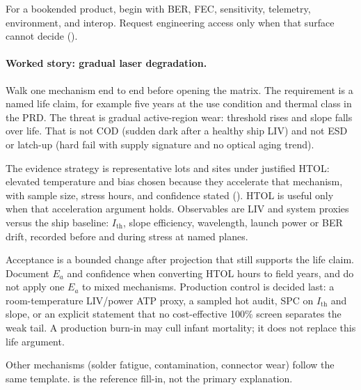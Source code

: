 
For a bookended product, begin with BER, FEC, sensitivity, telemetry,
environment, and interop. Request engineering access only when that surface
cannot decide ().

\paragraph{Worked story: gradual laser degradation.}
Walk one mechanism end to end before opening the matrix. The requirement is a
named life claim, for example five years at the use condition and thermal class
in the PRD. The threat is gradual active-region wear: threshold rises and slope
falls over life. That is not COD (sudden dark after a healthy ship LIV) and not
ESD or latch-up (hard fail with supply signature and no optical aging trend).

The evidence strategy is representative lots and sites under justified HTOL:
elevated temperature and bias chosen because they accelerate that mechanism,
with sample size, stress hours, and confidence stated
(). HTOL is useful only when that
acceleration argument holds. Observables are LIV and system proxies versus the
ship baseline: $I_\mathrm{th}$, slope efficiency, wavelength, launch power or
BER drift, recorded before and during stress at named planes.

Acceptance is a bounded change after projection that still supports the life
claim. Document $E_a$ and confidence when converting HTOL hours to field years,
and do not apply one $E_a$ to mixed mechanisms. Production control is decided
last: a room-temperature LIV/power ATP proxy, a sampled hot audit, SPC on
$I_\mathrm{th}$ and slope, or an explicit statement that no cost-effective 100\%
screen separates the weak tail. A production burn-in may cull infant mortality;
it does not replace this life argument.

Other mechanisms (solder fatigue, contamination, connector wear) follow the same
template.  is the reference fill-in, not the
primary explanation.

